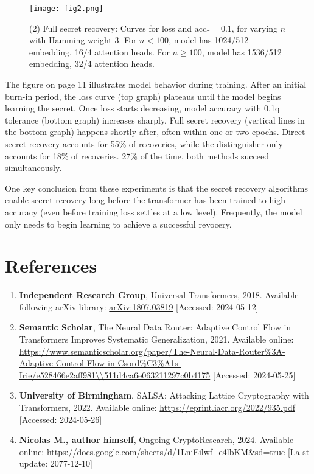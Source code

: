\documentclass{article}
\begin{document}
    \begin{figure}[!htp]
    \centering
    \texttt{[image: fig2.png]}
    \caption{(2) Full secret recovery: Curves for loss and \( \text{acc}_\tau = 0.1 \), for varying \( n \) with Hamming weight 3. For \( n < 100 \), model has 1024/512 embedding, 16/4 attention heads. For \( n \geq 100 \), model has 1536/512 embedding, 32/4 attention heads.}
    \end{figure}
    
    The figure on page 11 illustrates model behavior during training. After an initial burn-in period, the loss curve (top graph) plateaus until the model begins learning the secret. Once loss starts decreasing, model accuracy with 0.1q tolerance (bottom graph) increases sharply. Full secret recovery (vertical lines in the bottom graph) happens shortly after, often within one or two epochs. Direct secret recovery accounts for 55\% of recoveries, while the distinguisher only accounts for 18\% of recoveries. 27\% of the time, both methods succeed simultaneously.
    
    One key conclusion from these experiments is that the secret recovery algorithms enable secret recovery long before the transformer has been trained to high accuracy (even before training loss settles at a low level). Frequently, the model only needs to begin learning to achieve a successful revocery.    

\newpage

\section*{References}
\begin{enumerate}
    \item \textbf{Independent Research Group}, Universal Transformers, 2018. Available following arXiv library: \url{arXiv:1807.03819} [Accessed: 2024-05-12]
    \item \textbf{Semantic Scholar}, The Neural Data Router: Adaptive Control Flow in Transformers Improves Systematic Generalization, 2021. Available online: \url{https://www.semanticscholar.org/paper/The-Neural-Data-Router%3A-Adaptive-Control-Flow-in-Csord%C3%A1s-Irie/e528466e2aff981\\511d4ca6e063211297c0b4175} [Accessed: 2024-05-25]
    \item \textbf{University of Birmingham}, SALSA: Attacking Lattice Cryptography with Transformers, 2022. Available online: \url{https://eprint.iacr.org/2022/935.pdf} [Accessed: 2024-05-26]
    \item \textbf{Nicolas M., author himself}, Ongoing CryptoResearch, 2024. Available online: \href{https://www.petsourcing.com/wp-content/uploads/2018/11/How-to-Take-Care-of-Your-Cat-696x602.jpg}{https://docs.google.com/sheets/d/1LniEilwf\_e4lbKM\&sd=true} [La-st update: 2077-12-10]
\end{enumerate}
\end{document}
